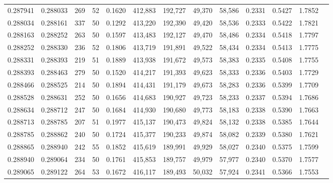\begin{tabular}{rrrrrrrrrrrrr}
0.287941 & 0.288033 &   269 &  52 &                                     0.1620 & 412,883 & 192,727 &  49,370 &  58,586 & 0.2331 & 0.5427 & 1.7852 \\
0.288034 & 0.288161 &   337 &  50 &                                     0.1292 & 413,220 & 192,390 &  49,420 &  58,536 & 0.2333 & 0.5422 & 1.7821 \\
0.288163 & 0.288252 &   263 &  50 &                                     0.1597 & 413,483 & 192,127 &  49,470 &  58,486 & 0.2334 & 0.5418 & 1.7797 \\
0.288252 & 0.288330 &   236 &  52 &                                     0.1806 & 413,719 & 191,891 &  49,522 &  58,434 & 0.2334 & 0.5413 & 1.7775 \\
0.288331 & 0.288393 &   219 &  51 &                                     0.1889 & 413,938 & 191,672 &  49,573 &  58,383 & 0.2335 & 0.5408 & 1.7755 \\
0.288393 & 0.288463 &   279 &  50 &                                     0.1520 & 414,217 & 191,393 &  49,623 &  58,333 & 0.2336 & 0.5403 & 1.7729 \\
0.288466 & 0.288525 &   214 &  50 &                                     0.1894 & 414,431 & 191,179 &  49,673 &  58,283 & 0.2336 & 0.5399 & 1.7709 \\
0.288528 & 0.288631 &   252 &  50 &                                     0.1656 & 414,683 & 190,927 &  49,723 &  58,233 & 0.2337 & 0.5394 & 1.7686 \\
0.288634 & 0.288712 &   247 &  50 &                                     0.1684 & 414,930 & 190,680 &  49,773 &  58,183 & 0.2338 & 0.5390 & 1.7663 \\
0.288713 & 0.288785 &   207 &  51 &                                     0.1977 & 415,137 & 190,473 &  49,824 &  58,132 & 0.2338 & 0.5385 & 1.7644 \\
0.288785 & 0.288862 &   240 &  50 &                                     0.1724 & 415,377 & 190,233 &  49,874 &  58,082 & 0.2339 & 0.5380 & 1.7621 \\
0.288865 & 0.288940 &   242 &  55 &                                     0.1852 & 415,619 & 189,991 &  49,929 &  58,027 & 0.2340 & 0.5375 & 1.7599 \\
0.288940 & 0.289064 &   234 &  50 &                                     0.1761 & 415,853 & 189,757 &  49,979 &  57,977 & 0.2340 & 0.5370 & 1.7577 \\
0.289065 & 0.289122 &   264 &  53 &                                     0.1672 & 416,117 & 189,493 &  50,032 &  57,924 & 0.2341 & 0.5366 & 1.7553 \\

\end{tabular}
